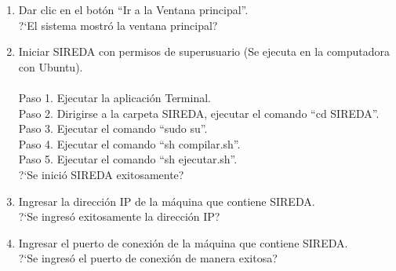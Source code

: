 \begin{enumerate}
	\item {Dar clic en el botón ``Ir a la Ventana principal''.\\	
	?`El sistema mostró la ventana principal?
	}
	\item {Iniciar SIREDA con permisos de superusuario (Se ejecuta en la computadora con Ubuntu).\\
	\\ Paso 1. Ejecutar la aplicación Terminal.
	\\ Paso 2. Dirigirse a la carpeta SIREDA, ejecutar el comando ``cd SIREDA''.
	\\ Paso 3. Ejecutar el comando ``sudo su''.
	\\ Paso 4. Ejecutar el comando ``sh compilar.sh''.
	\\ Paso 5. Ejecutar el comando ``sh ejecutar.sh''.\\
	?`Se inició SIREDA exitosamente?
	}
	\item {Ingresar la dirección IP de la máquina que contiene SIREDA.\\
			?`Se ingresó exitosamente la dirección IP?
	}
	\item {Ingresar el puerto de conexión de la máquina que contiene SIREDA.\\
			?`Se ingresó el puerto de conexión de manera exitosa?
	}
\end{enumerate}
